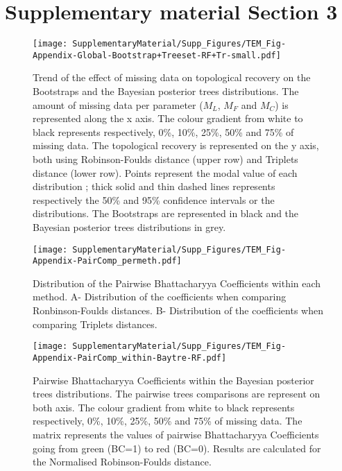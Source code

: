 \section{Supplementary material Section 3}

\begin{figure} 
\centering
    \texttt{[image: SupplementaryMaterial/Supp\_Figures/TEM\_Fig-Appendix-Global-Bootstrap+Treeset-RF+Tr-small.pdf]}
\caption{Trend of the effect of missing data on topological recovery on the Bootstraps and the Bayesian posterior trees distributions. The amount of missing data per parameter ($M_{L}$, $M_{F}$ and $M_{C}$) is represented along the x axis. The colour gradient from white to black represents respectively, 0\%, 10\%, 25\%, 50\% and 75\% of missing data. The topological recovery is represented on the y axis, both using Robinson-Foulds distance (upper row) and Triplets distance (lower row). Points represent the modal value of each distribution ; thick solid and thin dashed lines represents respectively the 50\% and 95\% confidence intervals or the distributions. The Bootstraps are represented in black and the Bayesian posterior trees distributions in grey.}
\label{Fig_global_BootTreesets} %
\end{figure}

\begin{figure} 
\centering
    \texttt{[image: SupplementaryMaterial/Supp\_Figures/TEM\_Fig-Appendix-PairComp\_permeth.pdf]}
\caption{Distribution of the Pairwise Bhattacharyya Coefficients within each method. A- Distribution of the coefficients when comparing Ronbinson-Foulds distances. B- Distribution of the coefficients when comparing Triplets distances.}
\label{Fig_Bhatt.coeff_distribution} %
\end{figure}

\begin{figure} 
\centering
    \texttt{[image: SupplementaryMaterial/Supp\_Figures/TEM\_Fig-Appendix-PairComp\_within-Baytre-RF.pdf]}
\caption{Pairwise Bhattacharyya Coefficients within the Bayesian posterior trees distributions. The pairwise trees comparisons are represent on both axis. The colour gradient from white to black represents respectively, 0\%, 10\%, 25\%, 50\% and 75\% of missing data. The matrix represents the values of pairwise Bhattacharyya Coefficients going from green (BC=1) to red (BC=0). Results are calculated for the Normalised Robinson-Foulds distance.}
\label{Fig_pairComp-Baytree-RF}
\end{figure} %

